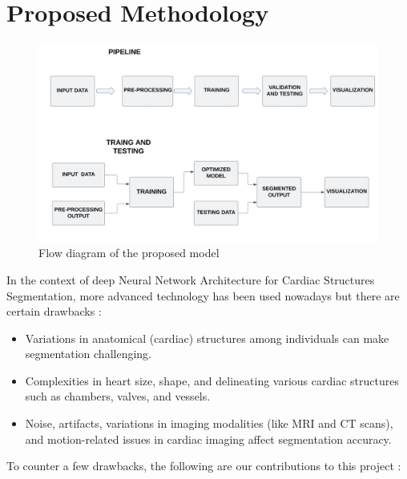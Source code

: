 \documentclass[runningheads]{llncs}
\begin{document}
\section{Proposed Methodology}
\label{proposed}
\begin{figure}[h]
    \centering
    \includegraphics[width=\textwidth]{pipeline.jpg}
    \caption{Flow diagram of the proposed model}
    \label{fig: flow}
\end{figure}
In the context of deep Neural Network Architecture for Cardiac Structures Segmentation, more advanced technology has been used nowadays but there are certain drawbacks :
\begin{itemize}
    \item Variations in anatomical (cardiac) structures among individuals can make segmentation challenging.
    \item Complexities in heart size, shape, and delineating various cardiac structures such as chambers, valves, and vessels.
    \item   Noise, artifacts, variations in imaging modalities (like MRI and CT scans), and motion-related issues in cardiac imaging affect segmentation accuracy.

\end{itemize}
To counter a few drawbacks, the following are our contributions to this project : 
\end{document}
